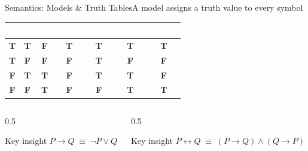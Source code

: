 \documentclass[aspectratio=169,11pt]{beamer}
\newcommand{\TT}{\textcolor{SuccessGreen}{\textbf{T}}}
\newcommand{\FF}{\textcolor{AlertRed}{\textbf{F}}}
\begin{document}
\begin{frame}{Semantics: Models \& Truth Tables}{A model assigns a truth value to every symbol}
  \begin{center}
  \small
  \renewcommand{\arraystretch}{1.15}
  \setlength{\tabcolsep}{4pt}
  \begin{tabular}{cc|c|c|c|c|c}
    \rowcolor{PrimaryDark}
    \textcolor{white}{$P$} & \textcolor{white}{$Q$} &
    \textcolor{white}{$\neg P$} & \textcolor{white}{$P\land Q$} &
    \textcolor{white}{$P\lor Q$} & \textcolor{white}{$P\rightarrow Q$} &
    \textcolor{white}{$P\leftrightarrow Q$} \\
    \midrule
    \TT & \TT & \FF & \TT & \TT & \TT & \TT \\
    \rowcolor{PrimaryLight!20}
    \TT & \FF & \FF & \FF & \TT & \FF & \FF \\
    \FF & \TT & \TT & \FF & \TT & \TT & \FF \\
    \rowcolor{PrimaryLight!20}
    \FF & \FF & \TT & \FF & \FF & \TT & \TT \\
    \bottomrule
  \end{tabular}
  \end{center}
  \vspace{0.4em}
  \begin{columns}[T]
    \begin{column}{0.5\textwidth}
      \begin{block}{Key insight}
        \small $P \rightarrow Q \;\equiv\; \neg P \lor Q$
      \end{block}
    \end{column}
    \begin{column}{0.5\textwidth}
      \begin{exampleblock}{Key insight}
        \small $P \leftrightarrow Q \;\equiv\; (P\rightarrow Q)\land(Q\rightarrow P)$
      \end{exampleblock}
    \end{column}
  \end{columns}
\end{frame}
\end{document}
